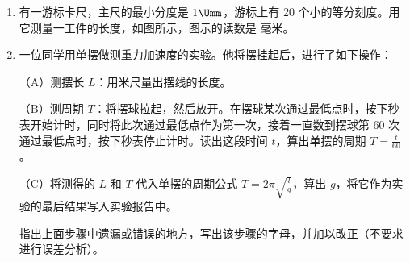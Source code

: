 \documentclass[\gkver]{gaokaozhenti}
\begin{document}
\begin{enumerate}


\item
有一游标卡尺，主尺的最小分度是 $1\Umm$，游标上有 20 个小的等分刻度。用它测量一工件的长度，如图所示，图示的读数是  毫米。



\item
一位同学用单摆做测重力加速度的实验。他将摆挂起后，进行了如下操作：

（A）测摆长 $L$：用米尺量出摆线的长度。

（B）测周期 $T$：将摆球拉起，然后放开。在摆球某次通过最低点时，按下秒表开始计时，同时将此次通过最低点作为第一次，接着一直数到摆球第 60 次通过最低点时，按下秒表停止计时。读出这段时间 $t$，算出单摆的周期 $T=\frac{t}{60}$。

（C）将测得的 $L$ 和 $T$ 代入单摆的周期公式 $T=2\pi\sqrt{\frac{l}{g}}$，算出 $g$，将它作为实验的最后结果写入实验报告中。

指出上面步骤中遗漏或错误的地方，写出该步骤的字母，并加以改正（不要求进行误差分析）。



\end{enumerate}
\end{document}

